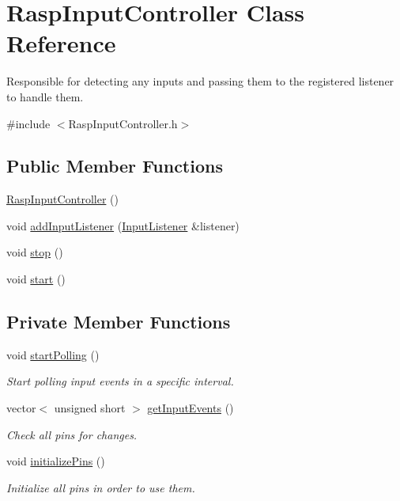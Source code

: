 \hypertarget{class_rasp_input_controller}{}\section{Rasp\+Input\+Controller Class Reference}
\label{class_rasp_input_controller}


Responsible for detecting any inputs and passing them to the registered listener to handle them.  




{\ttfamily \#include $<$Rasp\+Input\+Controller.\+h$>$}

\subsection*{Public Member Functions}
\begin{DoxyCompactItemize}
\item 
\hyperlink{class_rasp_input_controller_a63a9e2ab7d0eb5aed2da6068454caa65}{Rasp\+Input\+Controller} ()
\item 
void \hyperlink{class_rasp_input_controller_a31d6f6befaea44931f0010175bfe1a17}{add\+Input\+Listener} (\hyperlink{class_input_listener}{Input\+Listener} \&listener)
\item 
void \hyperlink{class_rasp_input_controller_a7d9523be1a83acde964cb5d2b1d281ed}{stop} ()
\item 
void \hyperlink{class_rasp_input_controller_a8cb185caa124285987d6b98122cfbea4}{start} ()
\end{DoxyCompactItemize}
\subsection*{Private Member Functions}
\begin{DoxyCompactItemize}
\item 
void \hyperlink{class_rasp_input_controller_a7e15590d321b382fcb5f4d70959a5cbe}{start\+Polling} ()
\begin{DoxyCompactList}\small\item\em Start polling input events in a specific interval. \end{DoxyCompactList}\item 
vector$<$ unsigned short $>$ \hyperlink{class_rasp_input_controller_a95a42703b4c0bca34ba966745bad5dff}{get\+Input\+Events} ()
\begin{DoxyCompactList}\small\item\em Check all pins for changes. \end{DoxyCompactList}\item 
void \hyperlink{class_rasp_input_controller_a5ffc6f68b0c74f31a9b595ff8acc49f1}{initialize\+Pins} ()
\begin{DoxyCompactList}\small\item\em Initialize all pins in order to use them. \end{DoxyCompactList}\end{DoxyCompactItemize}

